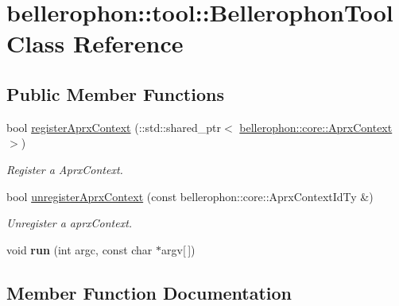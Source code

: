 \hypertarget{classbellerophon_1_1tool_1_1BellerophonTool}{}\section{bellerophon\+:\+:tool\+:\+:Bellerophon\+Tool Class Reference}
\label{classbellerophon_1_1tool_1_1BellerophonTool}
\subsection*{Public Member Functions}
\begin{DoxyCompactItemize}
\item 
bool \hyperlink{classbellerophon_1_1tool_1_1BellerophonTool_aa10f85c0047eae4a7c2873995a9374f1}{register\+Aprx\+Context} (\+::std\+::shared\+\_\+ptr$<$ \hyperlink{classbellerophon_1_1core_1_1AprxContext}{bellerophon\+::core\+::\+Aprx\+Context} $>$)
\begin{DoxyCompactList}\small\item\em Register a Aprx\+Context. \end{DoxyCompactList}\item 
bool \hyperlink{classbellerophon_1_1tool_1_1BellerophonTool_abc426eaa463291b1f431e6c24c73c80e}{unregister\+Aprx\+Context} (const bellerophon\+::core\+::\+Aprx\+Context\+Id\+Ty \&)
\begin{DoxyCompactList}\small\item\em Unregister a aprx\+Context. \end{DoxyCompactList}\item 
\hypertarget{classbellerophon_1_1tool_1_1BellerophonTool_afe04397aa4e7b73185496f9c70c785a4}{}\label{classbellerophon_1_1tool_1_1BellerophonTool_afe04397aa4e7b73185496f9c70c785a4} 
void {\bfseries run} (int argc, const char $\ast$argv\mbox{[}$\,$\mbox{]})
\end{DoxyCompactItemize}


\subsection{Member Function Documentation}
\hypertarget{classbellerophon_1_1tool_1_1BellerophonTool_aa10f85c0047eae4a7c2873995a9374f1}{}\label{classbellerophon_1_1tool_1_1BellerophonTool_aa10f85c0047eae4a7c2873995a9374f1} 
